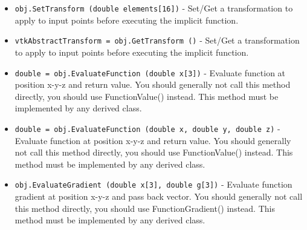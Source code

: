 \begin{itemize}
\item  \verb|obj.SetTransform (double elements[16])| -  Set/Get a transformation to apply to input points before
 executing the implicit function.

\item  \verb|vtkAbstractTransform = obj.GetTransform ()| -  Set/Get a transformation to apply to input points before
 executing the implicit function.

\item  \verb|double = obj.EvaluateFunction (double x[3])| -  Evaluate function at position x-y-z and return value.  You should
 generally not call this method directly, you should use 
 FunctionValue() instead.  This method must be implemented by 
 any derived class. 

\item  \verb|double = obj.EvaluateFunction (double x, double y, double z)| -  Evaluate function at position x-y-z and return value.  You should
 generally not call this method directly, you should use 
 FunctionValue() instead.  This method must be implemented by 
 any derived class. 

\item  \verb|obj.EvaluateGradient (double x[3], double g[3])| -  Evaluate function gradient at position x-y-z and pass back vector. 
 You should generally not call this method directly, you should use 
 FunctionGradient() instead.  This method must be implemented by 
 any derived class. 

\end{itemize}
